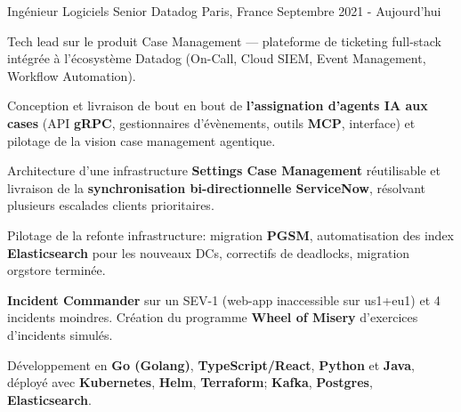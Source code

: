 

\begin{cventries}

  \cventry
    {Ingénieur Logiciels Senior} %
    {Datadog} %
    {Paris, France} %
    {Septembre 2021 - Aujourd'hui} %
    {
      \begin{cvitems} %
        \item {Tech lead sur le produit Case Management — plateforme de ticketing full-stack intégrée à l'écosystème Datadog (On-Call, Cloud SIEM, Event Management, Workflow Automation).}
        \item {Conception et livraison de bout en bout de \textbf{l'assignation d'agents IA aux cases} (API \textbf{gRPC}, gestionnaires d'évènements, outils \textbf{MCP}, interface) et pilotage de la vision case management agentique.}
        \item {Architecture d'une infrastructure \textbf{Settings Case Management} réutilisable et livraison de la \textbf{synchronisation bi-directionnelle ServiceNow}, résolvant plusieurs escalades clients prioritaires.}
        \item {Pilotage de la refonte infrastructure: migration \textbf{PGSM}, automatisation des index \textbf{Elasticsearch} pour les nouveaux DCs, correctifs de deadlocks, migration orgstore terminée.}
        \item {\textbf{Incident Commander} sur un SEV-1 (web-app inaccessible sur us1+eu1) et 4 incidents moindres. Création du programme \textbf{Wheel of Misery} d'exercices d'incidents simulés.}
        \item {Développement en \textbf{Go (Golang)}, \textbf{TypeScript/React}, \textbf{Python} et \textbf{Java}, déployé avec \textbf{Kubernetes}, \textbf{Helm}, \textbf{Terraform}; \textbf{Kafka}, \textbf{Postgres}, \textbf{Elasticsearch}.}
      \end{cvitems}
    }


\end{cventries}
